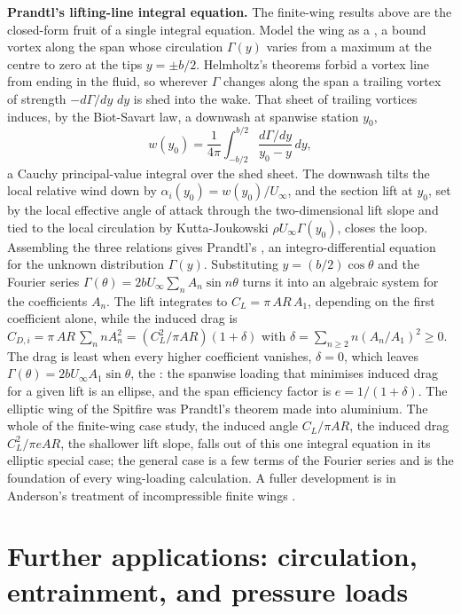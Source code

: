\begin{mastery}
\textbf{Prandtl's lifting-line integral equation.} The finite-wing
results above are the closed-form fruit of a single integral equation.
Model the wing as a , a bound vortex along the
span whose circulation $\Gamma(y)$ varies from a maximum at the centre
to zero at the tips $y = \pm b/2$. Helmholtz's theorems forbid a vortex
line from ending in the fluid, so wherever $\Gamma$ changes along the
span a trailing vortex of strength $-d\Gamma/dy\,\,dy$ is shed into the
wake. That sheet of trailing vortices induces, by the Biot-Savart law,
a downwash at spanwise station $y_0$,
\[
w(y_0) = \frac{1}{4\pi}\int_{-b/2}^{b/2}
\frac{d\Gamma/dy}{y_0 - y}\,dy,
\]
a Cauchy principal-value integral over the shed sheet. The downwash
tilts the local relative wind down by $\alpha_i(y_0) = w(y_0)/U_\infty$,
and the section lift at $y_0$, set by the local effective angle of
attack through the two-dimensional lift slope and tied to the local
circulation by Kutta-Joukowski $\rho U_\infty\Gamma(y_0)$, closes the
loop. Assembling the three relations gives Prandtl's
, an integro-differential equation for the
unknown distribution $\Gamma(y)$. Substituting $y = (b/2)\cos\theta$
and the Fourier series $\Gamma(\theta) = 2bU_\infty\sum_n A_n\sin
n\theta$ turns it into an algebraic system for the coefficients $A_n$.
The lift integrates to $C_L = \pi\,AR\,A_1$, depending on the first
coefficient alone, while the induced drag is $C_{D,i} = \pi\,AR\,\sum_n
n A_n^2 = (C_L^2/\pi AR)(1 + \delta)$ with $\delta = \sum_{n\ge 2}
n(A_n/A_1)^2 \ge 0$. The drag is least when every higher coefficient
vanishes, $\delta = 0$, which leaves $\Gamma(\theta) = 2bU_\infty A_1
\sin\theta$, the : the spanwise loading
that minimises induced drag for a given lift is an ellipse, and the
span efficiency factor is $e = 1/(1 + \delta)$. The elliptic wing of
the Spitfire was Prandtl's theorem made into aluminium. The whole of
the finite-wing case study, the induced angle $C_L/\pi AR$, the
induced drag $C_L^2/\pi e AR$, the shallower lift slope, falls out of
this one integral equation in its elliptic special case; the general
case is a few terms of the Fourier series and is the foundation of
every wing-loading calculation. A fuller development is in Anderson's
treatment of incompressible finite wings
\cite[chap.~5]{text:anderson-aerodynamics}.
\end{mastery}

\section{Further applications: circulation, entrainment, and pressure loads}

